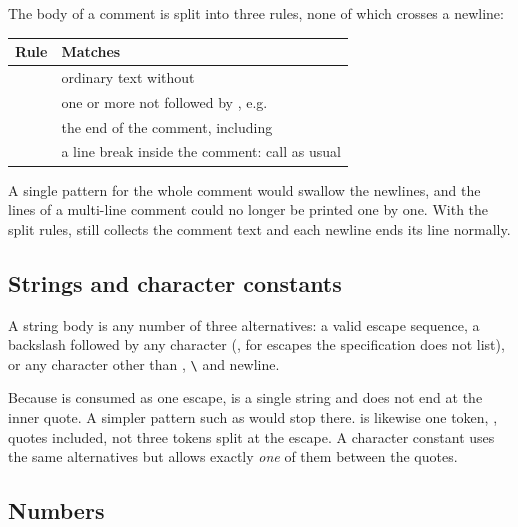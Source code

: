 \documentclass[12pt]{article}
\begin{document}
The body of a comment is split into three rules, none of which crosses a newline:

\begin{center}
\begin{tabularx}{0.92\linewidth}{@{}lL@{}}
\toprule
Rule & Matches \\
\midrule
\code{[^*\n]+} & ordinary text without \code{*} \\
 & one or more \code{*} not followed by \code{/}, e.g.\  \\
 & the end of the comment, including \code{**/} \\
\code{\n} & a line break inside the comment: call  as usual \\
\bottomrule
\end{tabularx}
\end{center}

A single pattern for the whole comment would swallow the newlines, and the lines of a multi-line
comment could no longer be printed one by one. With the split rules,  still
collects the comment text and each newline ends its line normally.

\subsection{Strings and character constants}


A string body is any number of three alternatives: a valid escape sequence, a backslash followed by
any character (, for escapes the specification does not list), or any character other than
, \texttt{\textbackslash} and newline.

Because \code{\"} is consumed as one escape,  is a single string and does not end at the
inner quote. A simpler pattern such as  would stop there.
 is likewise one token, , quotes included, not three tokens split at
the escape. A character constant uses the same alternatives but
allows exactly \emph{one} of them between the quotes.

\subsection{Numbers}

\end{document}
